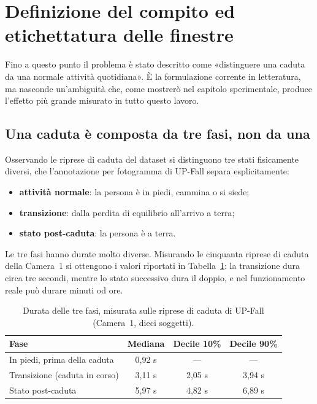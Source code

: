 
\section{Definizione del compito ed etichettatura delle finestre}

Fino a questo punto il problema è stato descritto come «distinguere una caduta
da una normale attività quotidiana». È la formulazione corrente in letteratura,
ma nasconde un'ambiguità che, come mostrerò nel capitolo sperimentale, produce
l'effetto più grande misurato in tutto questo lavoro.

\subsection{Una caduta è composta da tre fasi, non da una}

Osservando le riprese di caduta del dataset si distinguono tre stati
fisicamente diversi, che l'annotazione per fotogramma di UP-Fall separa
esplicitamente:

\begin{itemize}
    \item \textbf{attività normale}: la persona è in piedi, cammina o si siede;
    \item \textbf{transizione}: dalla perdita di equilibrio all'arrivo a terra;
    \item \textbf{stato post-caduta}: la persona è a terra.
\end{itemize}

Le tre fasi hanno durate molto diverse. Misurando le cinquanta riprese di
caduta della Camera~1 si ottengono i valori riportati in
Tabella~\ref{tab:durate_fasi}: la transizione dura circa tre secondi, mentre lo
stato successivo dura il doppio, e nel funzionamento reale può durare minuti od
ore.

\begin{table}[ht]
\centering
\caption{Durata delle tre fasi, misurata sulle riprese di caduta di UP-Fall
(Camera~1, dieci soggetti).}
\label{tab:durate_fasi}
\begin{tabular}{lccc}
\hline
\textbf{Fase} & \textbf{Mediana} & \textbf{Decile 10\%} & \textbf{Decile 90\%} \\
\hline
In piedi, prima della caduta & 0,92 s & --- & --- \\
Transizione (caduta in corso) & 3,11 s & 2,05 s & 3,94 s \\
Stato post-caduta & 5,97 s & 4,82 s & 6,89 s \\
\hline
\end{tabular}
\end{table}

